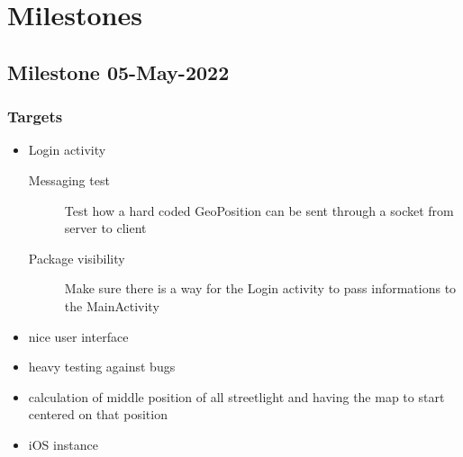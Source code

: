 \documentclass[a4paper,12pt]{book}
\begin{document}

\chapter{Milestones}




\bigskip
\bigskip
\bigskip
\medskip
\medskip
\section{\scalebox{1.5}Milestone 05-May-2022}

\subsection{Targets}
%
\begin{itemize}
 \item{Login activity}
   \begin{description}
   \item[Messaging test]{Test how a hard coded GeoPosition can be sent through a socket from server to client}
   \item[Package visibility]{Make sure there is a way for the Login activity to pass informations to the MainActivity}
   \end{description}
 \item{nice user interface}
 \item{heavy testing against bugs}
 \item{calculation of middle position of all streetlight and having the map to start centered on that position}
 \item{iOS instance}
\end{itemize}
\end{document}

